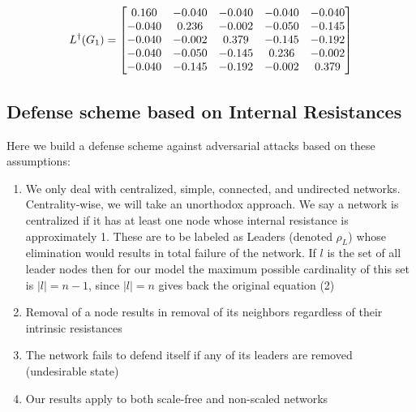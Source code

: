 \documentclass{article}
\begin{document}
	\hspace{2pt}
	
	\[
	L^{\dag}(G_1)=
	\begin{bmatrix}
		0.160 & -0.040 & -0.040 & -0.040 & -0.040 \cr
		-0.040 &  0.236 & -0.002 & -0.050 & -0.145 \cr
		-0.040 & -0.002 &  0.379 & -0.145 & -0.192 \cr
		-0.040 & -0.050 & -0.145 &  0.236 & -0.002 \cr
		-0.040 & -0.145 & -0.192 & -0.002 &  0.379
	\end{bmatrix}
	\]
	\subsection{Defense scheme based on Internal Resistances}
	Here we build a defense scheme against adversarial attacks based on these assumptions:
	
	\begin{enumerate}
		\item {We only deal with centralized, simple, connected, and undirected networks.}
		Centrality-wise, we will take an unorthodox approach. We say a network is centralized if it has at least one node whose internal resistance is approximately 1. These are to be labeled as Leaders (denoted $\rho_L$) whose elimination would results in total failure of the network. If $l$ is the set of all leader nodes then for our model the maximum possible cardinality of this set is $|l| = n-1$, since $|l|=n$ gives back the original equation (2)
		\item {Removal of a node results in removal of its neighbors regardless of their intrinsic resistances}
		\item {The network fails to defend itself if any of its leaders are removed (undesirable state)}
		\item {Our results apply to both scale-free and non-scaled networks}
	\end{enumerate}
	
\end{document}

